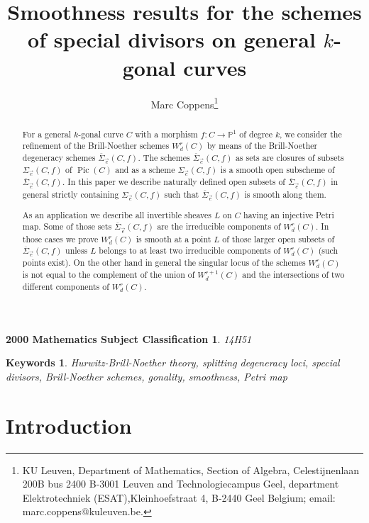 \documentclass{article}
\author{Marc Coppens\footnote{KU  Leuven, Department of Mathematics, Section of Algebra,
Celestijnenlaan 200B bus 2400 B-3001 Leuven and Technologiecampus Geel, department Elektrotechniek (ESAT),Kleinhoefstraat 4, B-2440 Geel Belgium; email: marc.coppens@kuleuven.be.}}
\title{Smoothness results for the schemes of special divisors on general $k$-gonal curves}
\date{}
\DeclareMathOperator{\Pic}{Pic}
\newtheorem*{subject}{2000 Mathematics Subject Classification}
\newtheorem*{keywords}{Keywords}
\theoremstyle{definition}
\theoremstyle{remark}
\begin{document}
\maketitle \noindent


\begin{abstract}
For a general $k$-gonal curve $C$ with a morphism $f: C \rightarrow \mathbb{P}^1$ of degree $k$, we consider the refinement of the Brill-Noether schemes $W^r_d(C)$ by means of the Brill-Noether degeneracy schemes $\overline{\Sigma}_{\overrightarrow {e}}(C,f)$.
The schemes  $\overline{\Sigma}_{\overrightarrow {e}}(C,f)$ as sets are closures of subsets  $\Sigma_{\overrightarrow {e}}(C,f)$ of $\Pic (C)$ and as a scheme  $\Sigma_{\overrightarrow {e}}(C,f)$ is a smooth open subscheme of  $\overline{\Sigma}_{\overrightarrow {e}}(C,f)$.
In this paper we describe naturally defined open subsets of  $\overline{\Sigma}_{\overrightarrow {e}}(C,f)$ in general strictly containing  $\Sigma_{\overrightarrow {e}}(C,f)$  such that  $\overline{\Sigma}_{\overrightarrow {e}}(C,f)$ is smooth along them.

As an application we describe all invertible sheaves $L$ on $C$ having an injective Petri map.
Some of those sets  $\overline{\Sigma}_{\overrightarrow {e}}(C,f)$ are the irreducible components of $W^r_d(C)$.
In those cases we prove $W^r_d(C)$ is smooth at a point $L$ of those larger open subsets of  $\overline{\Sigma}_{\overrightarrow {e}}(C,f)$ unless $L$ belongs to at least two irreducible components of $W^r_d(C)$ (such points exist).
On the other hand in general the singular locus of the schemes $W^r_d(C)$ is not equal to the complement of the union of $W^{r+1}_d(C)$ and the intersections of two different components of $W^r_d(C)$.
\end{abstract}

\begin{subject}
14H51
\end{subject}

\begin{keywords}
Hurwitz-Brill-Noether theory, splitting degeneracy loci, special divisors, Brill-Noether schemes, gonality, smoothness, Petri map
\end{keywords}

\section{Introduction}\label{section1}
\end{document}

